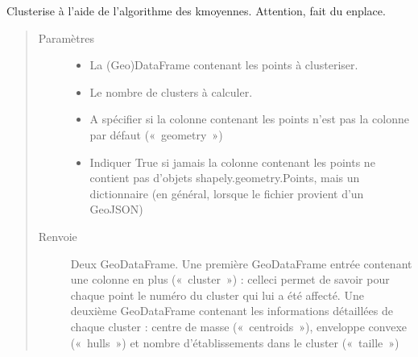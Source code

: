 \documentclass[letterpaper,10pt,french]{sphinxmanual}
\begin{document}
\begin{fulllineitems}
\label{\detokenize{index:src.clusterizer.clusterizer.clusterize}}
\sphinxAtStartPar
Clusterise à l’aide de l’algorithme des k\sphinxhyphen{}moyennes. Attention, fait du en\sphinxhyphen{}place.
\begin{quote}\begin{description}
\item[{Paramètres}] \leavevmode\begin{itemize}
\item {} 
\sphinxAtStartPar
{} \textendash{} La (Geo)DataFrame contenant les points à clusteriser.

\item {} 
\sphinxAtStartPar
{} \textendash{} Le nombre de clusters à calculer.

\item {} 
\sphinxAtStartPar
{} \textendash{} A spécifier si la colonne contenant les points n’est pas la colonne par défaut (« geometry »)

\item {} 
\sphinxAtStartPar
{} \textendash{} Indiquer True si jamais la colonne contenant les points ne contient pas d’objets
shapely.geometry.Points, mais un dictionnaire (en général, lorsque le fichier provient d’un GeoJSON)

\end{itemize}

\item[{Renvoie}] \leavevmode
\sphinxAtStartPar
Deux GeoDataFrame.
Une première GeoDataFrame entrée contenant une colonne en plus (« cluster ») : celle\sphinxhyphen{}ci permet de savoir pour chaque
point le numéro du cluster qui lui a été affecté.
Une deuxième GeoDataFrame contenant les informations détaillées de chaque cluster : centre de masse (« centroids »),
enveloppe convexe (« hulls ») et nombre d’établissements dans le cluster (« taille »)

\end{description}\end{quote}

\end{fulllineitems}
\end{document}
